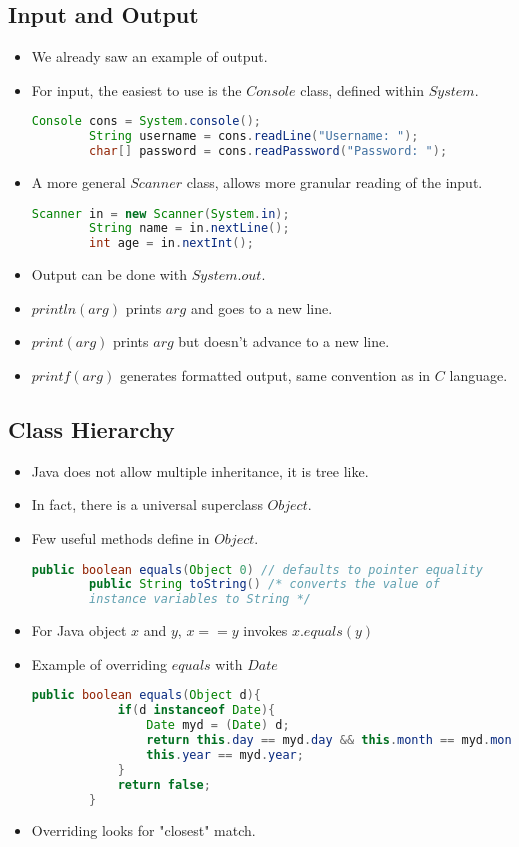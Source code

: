 \documentclass[a4paper]{article}
\begin{document}
\subsection{Input and Output}
\begin{itemize}
    \item We already saw an example of output.
    \item For input, the easiest to use is the $Console$ class, defined within $System$.
    \begin{lstlisting}[language=Java]
        Console cons = System.console();
        String username = cons.readLine("Username: ");
        char[] password = cons.readPassword("Password: ");
    \end{lstlisting}
    \item A more general $Scanner$ class, allows more granular reading of the input.
    \begin{lstlisting}[language=Java]
        Scanner in = new Scanner(System.in);
        String name = in.nextLine();
        int age = in.nextInt();
    \end{lstlisting}
    \item Output can be done with $System.out$.
    \item $println(arg)$ prints $arg$ and goes to a new line.
    \item $print(arg)$ prints $arg$ but doesn't advance to a new line.
    \item $printf(arg)$ generates formatted output, same convention as in $C$ language.
\end{itemize}

\subsection{Class Hierarchy}
\begin{itemize}
    \item Java does not allow multiple inheritance, it is tree like.
    \item In fact, there is a universal superclass $Object$.
    \item Few useful methods define in $Object$.
    \begin{lstlisting}[language=Java]
        public boolean equals(Object 0) // defaults to pointer equality
        public String toString() /* converts the value of 
        instance variables to String */
    \end{lstlisting}
    \item For Java object $x$ and $y$, $x==y$ invokes $x.equals(y)$
    \item Example of overriding $equals$ with $Date$
    \begin{lstlisting}[language=Java]
        public boolean equals(Object d){
            if(d instanceof Date){
                Date myd = (Date) d;
                return this.day == myd.day && this.month == myd.month &&
                this.year == myd.year;
            }
            return false;
        }
    \end{lstlisting}
    \item Overriding looks for "closest" match.
\end{itemize}
\end{document}
